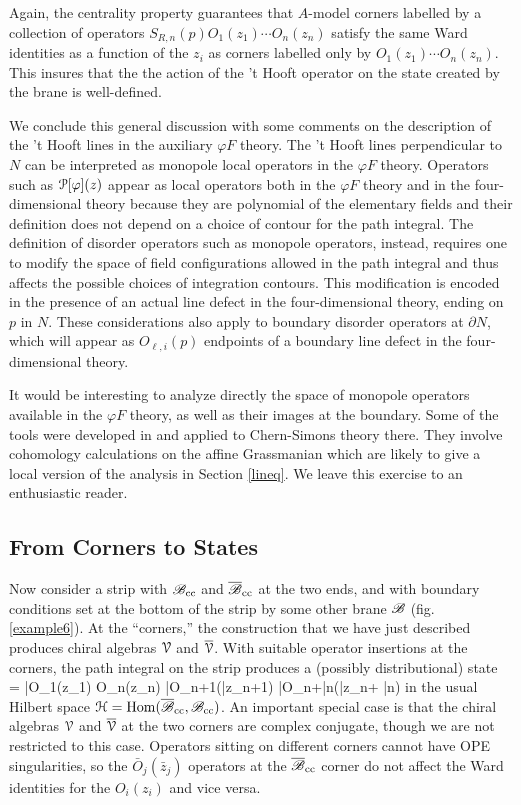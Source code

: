 \documentclass[11pt,a4paper]{article}
\begin{document}
Again, the centrality property guarantees that $A$-model corners labelled by a collection of operators $S_{R,n}(p) O_1(z_1) \cdots O_n(z_n)$
satisfy the same Ward identities as a function of the $z_i$ as corners labelled only by $O_1(z_1) \cdots O_n(z_n)$. This insures that the 
the action of the 't Hooft operator on the state created by the brane is well-defined. 

We conclude this general discussion with some comments on the description of the 't Hooft lines in the auxiliary $\varphi F$ theory. 
The 't Hooft lines perpendicular to $N$ can be interpreted as monopole local operators in the $\varphi F$ theory. Operators such as  ${\cal P}[\varphi](z)$
appear as local operators both in the $\varphi F$ theory and in the four-dimensional theory because they are polynomial of the elementary fields and
their definition does not depend on a choice of contour for the path integral. The definition of disorder operators such as monopole operators, instead, 
requires one to modify the space of field configurations allowed in the path integral and thus affects the possible choices of integration contours. This modification 
is encoded in the presence of an actual line defect in the four-dimensional theory, ending on $p$ in $N$.  These considerations also apply to boundary disorder operators 
at $\partial N$, which will appear as $O_{\ell,i}(p)$ endpoints of a boundary line defect in the four-dimensional theory. 

It would be interesting to analyze directly the space of monopole operators available in the $\varphi F$ theory, as well as their images at the boundary. 
Some of the tools were developed in \cite{Gaiotto:2016wcv} and applied to Chern-Simons theory there. They involve cohomology calculations on the 
affine Grassmanian which are likely to give a local version of the analysis in Section \ref{lineq}. We leave this exercise to an enthusiastic reader. 

\subsection{From Corners to States} \label{fcs}

Now consider a strip with ${\mathscr B}_{{\mathrm{cc}}}$ and $\overline {{\mathscr B}}_{{\mathrm{cc}}}$ at the two ends, and with boundary conditions set at the bottom of the strip
by some other brane ${\mathscr B}$ (fig. \ref{example6}).   At the ``corners,'' the construction that we have just described produces chiral algebras ${\mathcal V}$ and $\overline {{\mathcal V}}$.
With suitable operator insertions at the corners, the path integral on the strip  produces a (possibly distributional) state
\be\label{chidef}
\chi = \left|O_1(z_1) \cdots O_n(z_n) \bar O_{n+1}(\bar z_{n+1}) \cdots \bar O_{n+\bar n}(\bar z_{n+ \bar n})\right\rangle
\ee
 in the usual  Hilbert space ${\mathcal H}={\mathrm{Hom}}(\overline{{\mathscr B}}_{\mathrm{cc}},{\mathscr B}_{\mathrm{cc}})$.
An important special case is that the chiral algebras ${\mathcal V}$ and $\overline{{\mathcal V}}$ at the two corners are complex conjugate,
though we are not restricted to this case.  Operators sitting on different corners cannot have OPE singularities, so the $\bar O_j(\bar z_j)$ 
operators at the $\overline {{\mathscr B}}_{{\mathrm{cc}}}$ corner do not affect the Ward identities for the $O_i(z_i)$ and vice  versa. 
\end{document}
